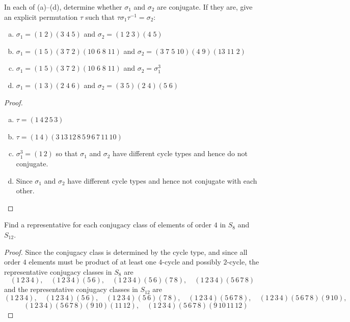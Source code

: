 \documentclass{article}
\newenvironment{problem}[2][Problem]{\begin{trivlist}
\item[\hskip \labelsep {\bfseries #1}\hskip \labelsep {\bfseries #2.}]}{\end{trivlist}}
\begin{document}
\begin{problem}{11}
     In each of (a)–(d), determine whether \( \sigma_1 \) and \( \sigma_2 \) are conjugate. If they are, give an explicit permutation \( \tau \) such that \( \tau \sigma_1 \tau^{-1} = \sigma_2 \):
    \begin{enumerate}[(a)]
        \item \( \sigma_1 = (1 \; 2)(3 \; 4 \; 5) \) and \( \sigma_2 = (1 \; 2 \; 3)(4 \; 5) \)
        \item \( \sigma_1 = (1 \; 5)(3 \; 7 \; 2)(10 \; 6 \; 8 \; 11) \) and \( \sigma_2 = (3 \; 7 \; 5 \; 10)(4 \; 9)(13 \; 11 \; 2) \)
        \item \( \sigma_1 = (1 \; 5)(3 \; 7 \; 2)(10 \; 6 \; 8 \; 11) \) and \( \sigma_2 = \sigma_1^3 \)
        \item \( \sigma_1 = (1 \; 3)(2 \; 4 \; 6) \) and \( \sigma_2 = (3 \; 5)(2 \; 4)(5 \; 6) \)
    \end{enumerate}
\end{problem}
\begin{proof}\hspace{1pt}
    \begin{enumerate}[(a)]
        \item $\tau = (1\, 4\, 2\, 5\, 3)$
        \item $\tau = (1\, 4)(3 \, 13\, 12\, 8\, 5 \, 9\, 6\, 7 \, 11\, 10)$
        \item $\sigma^3_1=(1\, 2)$ so that $\sigma_1$ and $\sigma_2$ have different cycle types and hence do not conjugate.
        \item Since $\sigma_1$ and $\sigma_2$ have different cycle types and hence not conjugate with each other.
    \end{enumerate}
\end{proof}
\begin{problem}{12}
Find a representative for each conjugacy class of elements of order $4$ in $S_8$ and $S_{12}$.
\end{problem}
\begin{proof}
    Since the conjugacy class is determined by the cycle type, and since all order $4$ elements must be product of at least one $4$-cycle and possibly $2$-cycle, the representative conjugacy classes in $S_8$ are \[
    (1\, 2\, 3\, 4),\quad (1\, 2\, 3\, 4)(5\, 6),\quad (1\, 2\, 3\, 4)(5\, 6)(7\, 8),\quad (1\, 2\, 3\, 4)(5\, 6\, 7\, 8)
    \]
    and the representative conjugacy classes in $S_{12}$ are 
    \[
    (1\, 2\, 3\, 4),\quad (1\, 2\, 3\, 4)(5\, 6),\quad (1\, 2\, 3\, 4)(5\, 6)(7\, 8),\quad (1\, 2\, 3\, 4)(5\, 6\, 7\, 8),\quad (1\, 2\, 3\, 4)(5\, 6\, 7\, 8)(9\, 10),\]\[\quad (1\, 2\, 3\, 4)(5\, 6\, 7\, 8)(9\, 10)(11\, 12),\quad (1\, 2\, 3\, 4)(5\, 6\, 7\, 8)(9\, 10\, 11\, 12)
    \]
\end{proof}
\end{document}
